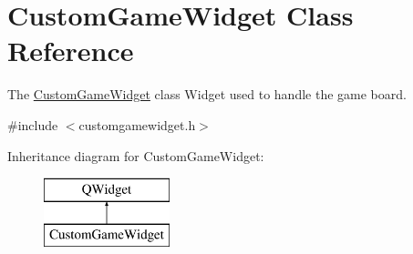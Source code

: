 \hypertarget{class_custom_game_widget}{}\section{Custom\+Game\+Widget Class Reference}
\label{class_custom_game_widget}


The \hyperlink{class_custom_game_widget}{Custom\+Game\+Widget} class Widget used to handle the game board.  




{\ttfamily \#include $<$customgamewidget.\+h$>$}

Inheritance diagram for Custom\+Game\+Widget\+:\begin{figure}[H]
\begin{center}
\leavevmode
\includegraphics[height=2.000000cm]{class_custom_game_widget}
\end{center}
\end{figure}
